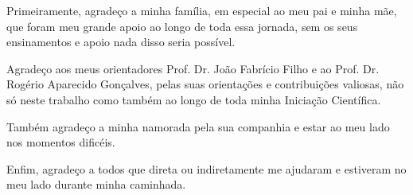 \begin{agradecimentos}%
    Primeiramente, agradeço a minha família, em especial ao meu pai e minha mãe, que foram meu grande apoio ao longo de toda essa jornada, sem os seus ensinamentos e apoio nada disso seria possível.

    Agradeço aos meus orientadores Prof. Dr. João Fabrício Filho e ao Prof. Dr. Rogério Aparecido Gonçalves, pelas suas orientações e contribuições valiosas, não só neste trabalho como também ao longo de toda minha Iniciação Científica.

    Também agradeço a minha namorada pela sua companhia e estar ao meu lado nos momentos dificéis.

    Enfim, agradeço a todos que direta ou indiretamente me ajudaram e estiveram no meu lado durante minha caminhada.
\end{agradecimentos}
